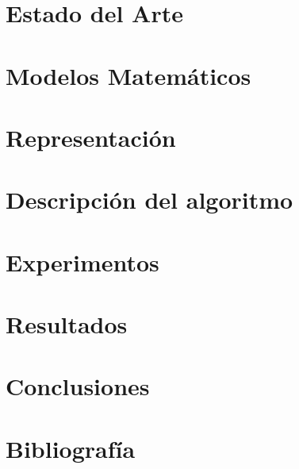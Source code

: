 \documentclass[10pt]{article}
\begin{document}
\section{Estado del Arte}
\label{sec:estado}

\section{Modelos Matemáticos}
\label{sec:modelo}

\section{Representación}
\label{sec:representacion}

\section{Descripción del algoritmo}
\label{sec:algoritmo}

\section{Experimentos}
\label{sec:experimentos}

\section{Resultados}
\label{sec:resultados}

\section{Conclusiones}
\label{sec:conclusiones}

\section{Bibliografía}


\end{document}
